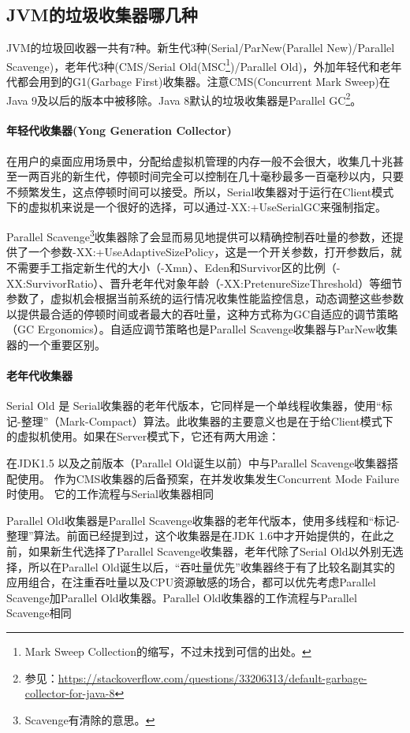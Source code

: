 \documentclass[../../../interview-questions.tex]{subfiles}
\begin{document}
\subsection{JVM的垃圾收集器哪几种}

JVM的垃圾回收器一共有7种。新生代3种(Serial/ParNew(Parallel New)/Parallel Scavenge)，老年代3种(CMS/Serial Old(MSC\footnote{Mark Sweep Collection的缩写，不过未找到可信的出处。})/Parallel Old)，外加年轻代和老年代都会用到的G1(Garbage First)收集器。注意CMS(Concurrent Mark Sweep)在Java 9及以后的版本中被移除。Java 8默认的垃圾收集器是Parallel GC\footnote{参见：\url{https://stackoverflow.com/questions/33206313/default-garbage-collector-for-java-8}}。

\paragraph{年轻代收集器(Yong Generation Collector)}
在用户的桌面应用场景中，分配给虚拟机管理的内存一般不会很大，收集几十兆甚至一两百兆的新生代，停顿时间完全可以控制在几十毫秒最多一百毫秒以内，只要不频繁发生，这点停顿时间可以接受。所以，Serial收集器对于运行在Client模式下的虚拟机来说是一个很好的选择，可以通过-XX:+UseSerialGC来强制指定。

Parallel Scavenge\footnote{Scavenge有清除的意思。}收集器除了会显而易见地提供可以精确控制吞吐量的参数，还提供了一个参数-XX:+UseAdaptiveSizePolicy，这是一个开关参数，打开参数后，就不需要手工指定新生代的大小（-Xmn）、Eden和Survivor区的比例（-XX:SurvivorRatio）、晋升老年代对象年龄（-XX:PretenureSizeThreshold）等细节参数了，虚拟机会根据当前系统的运行情况收集性能监控信息，动态调整这些参数以提供最合适的停顿时间或者最大的吞吐量，这种方式称为GC自适应的调节策略（GC Ergonomics）。自适应调节策略也是Parallel Scavenge收集器与ParNew收集器的一个重要区别。

\paragraph{老年代收集器}
Serial Old 是 Serial收集器的老年代版本，它同样是一个单线程收集器，使用“标记-整理”（Mark-Compact）算法。此收集器的主要意义也是在于给Client模式下的虚拟机使用。如果在Server模式下，它还有两大用途：

在JDK1.5 以及之前版本（Parallel Old诞生以前）中与Parallel Scavenge收集器搭配使用。
作为CMS收集器的后备预案，在并发收集发生Concurrent Mode Failure时使用。
它的工作流程与Serial收集器相同

Parallel Old收集器是Parallel Scavenge收集器的老年代版本，使用多线程和“标记-整理”算法。前面已经提到过，这个收集器是在JDK 1.6中才开始提供的，在此之前，如果新生代选择了Parallel Scavenge收集器，老年代除了Serial Old以外别无选择，所以在Parallel Old诞生以后，“吞吐量优先”收集器终于有了比较名副其实的应用组合，在注重吞吐量以及CPU资源敏感的场合，都可以优先考虑Parallel Scavenge加Parallel Old收集器。Parallel Old收集器的工作流程与Parallel Scavenge相同
\end{document}
